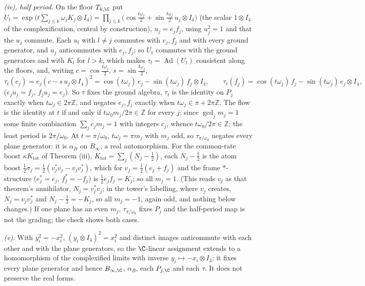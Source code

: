 \emph{(iv), half period.} 
On the floor $T_{k,\C}$ put $U_{t} = \exp\bigl(t\sum_{j \le k}\omega_{j}K_{j} \otimes I_4\bigr) = \prod_{j \le k}\bigl(\cos\tfrac{t\omega_{j}}{2} + \sin\tfrac{t\omega_{j}}{2}\,u_{j} \otimes I_4\bigr)$ (the scalar $1 \otimes I_4$ of the complexification, central by construction), $u_{j} = e_{j}f_{j}$, using $u_{j}^{2} = 1$ and that the $u_{j}$ commute. Each $u_{l}$ with $l \ne j$ commutes with $e_{j}, f_{j}$ and with every ground generator, and $u_{j}$ anticommutes with $e_{j}, f_{j}$; so $U_{t}$ commutes with the ground generators and with $K_{l}$ for $l > k$, which makes $\tau_{t} = \operatorname{Ad}(U_{t})$ consistent along the floors, and, writing $c = \cos\tfrac{t\omega_{j}}{2}$, $s = \sin\tfrac{t\omega_{j}}{2}$,
\[
\tau_{t}(e_{j}) = e_{j}(c - s\,u_{j} \otimes I_4)^{2} = \cos(t\omega_{j})\,e_{j} - \sin(t\omega_{j})\,f_{j} \otimes I_4, \qquad \tau_{t}(f_{j}) = \cos(t\omega_{j})\,f_{j} - \sin(t\omega_{j})\,e_{j} \otimes I_4,
\]
($e_{j}u_{j} = f_{j}$, $f_{j}u_{j} = e_{j}$). So $\tau$ fixes the ground algebra, $\tau_{t}$ is the identity on $P_{j}$ exactly when $t\omega_{j} \in 2\pi\mathbb{Z}$, and negates $e_{j}, f_{j}$ exactly when $t\omega_{j} \in \pi + 2\pi\mathbb{Z}$. The flow is the identity at $t$ if and only if $t\omega_{0}m_{j}/2\pi \in \mathbb{Z}$ for every $j$; since $\gcd_{j}m_{j} = 1$ some finite combination $\sum_{j}c_{j}m_{j} = 1$ with integers $c_{j}$, whence $t\omega_{0}/2\pi \in \mathbb{Z}$: the least period is $2\pi/\omega_{0}$. At $t = \pi/\omega_{0}$, $t\omega_{j} = \pi m_{j}$ with $m_{j}$ odd, so $\tau_{\pi/\omega_{0}}$ negates every plane generator: it is $\alpha_{B}$ on $B_{\infty}$, a real automorphism. For the common-rate boost $\kappa K_{\mathrm{tot}}$ of Theorem (iii), $K_{\mathrm{tot}} = \sum_{j}(N_{j} - \tfrac12)$, each $N_{j} - \tfrac12$ is the atom boost $\tfrac12\sigma_{j} = \tfrac12(v_{j}^{*}v_{j} - v_{j}v_{j}^{*})$, which for $v_{j} = \tfrac12(e_{j} + f_{j})$ and the frame $*$-structure ($e_{j}^{*} = e_{j}$, $f_{j}^{*} = -f_{j}$) is $\tfrac12 e_{j}f_{j} = K_{j}$; so all $m_{j} = 1$. (This reads $v_{j}$ as that theorem's annihilator, $N_{j} = v_{j}^{*}v_{j}$; in the tower's labelling, where $v_{j}$ creates, $N_{j} = v_{j}v_{j}^{*}$ and $N_{j} - \tfrac12 = -K_{j}$, so all $m_{j} = -1$, again odd, and nothing below changes.) If one plane has an even $m_{j}$, $\tau_{\pi/\omega_{0}}$ fixes $P_{j}$ and the half-period map is not the grading; the check shows both cases.

\emph{(v).} With $y_{i}^{2} = -x_{i}^{2}$, $(y_{i} \otimes I_4)^{2} = x_{i}^{2}$ and distinct images anticommute with each other and with the plane generators, so the $\C$-linear assignment extends to a homomorphism of the complexified limits with inverse $y_{i} \mapsto -x_{i} \otimes I_4$; it fixes every plane generator and hence $B_{\infty,\C}$, $\alpha_{B}$, each $P_{j,\C}$ and each $\tau$. It does not preserve the real forms.

